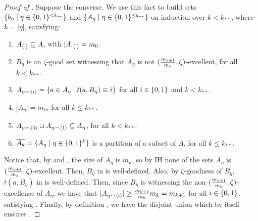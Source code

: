     \begin{proof}[Proof of ]
        Suppose the converse.
        We use this fact to build sets $\{ b_\eta \mid \eta \in \{ 0,1 \}^{<k_{**}} \}$ and
        $\{ A_\eta \mid \eta \in \{ 0,1 \}^{\leq k_{**}} \}$ on induction over $k<k_{**}$, where $k = |\eta|$,
        satisfying:
        \begin{enumerate}
            \item\label{itm:existance_of_excellent_subsets_fixed_size_choices.1} $A_{\left< \cdot \right>} \subseteq A$, with $|A|_{\left< \cdot \right>} = m_0$.
            \item\label{itm:existance_of_excellent_subsets_fixed_size_choices.2} $B_\eta$ is an $\zeta$-good set witnessing that $A_\eta$ is not
                $( \frac{m_{k+1}}{m_{k}}, \zeta )$-excellent, for all $k < k_{**}$.
            \item\label{itm:existance_of_excellent_subsets_fixed_size_choices.3} $A_{\eta \frown \left< i \right>} = \{ a \in A_\eta \mid t(a, B_\eta) \equiv i \}$
                for all $i \in \{ 0,1 \}$ and $k < k_{**}$.
            \item\label{itm:existance_of_excellent_subsets_fixed_size_choices.4} $|A_{\eta}| = m_k$, for all $k \leq k_{**}$.
            \item\label{itm:existance_of_excellent_subsets_fixed_size_choices.6} $A_{\eta \frown \left< 0 \right>} \sqcup A_{\eta \frown \left< 1 \right>} \subseteq A_\eta$,
                for all $k < k_{**}$.
            \item\label{itm:existance_of_excellent_subsets_fixed_size_choices.7} $\overline{A_k} = \{ A_\eta \mid \eta \in \{ 0,1 \}^k \}$ is a partition of
                a subset of $A$, for all $k \leq k_{**}$.
        \end{enumerate}
        Notice that, by  and
        , the size of $A_\eta$ is $m_k$,
        so by IH none of the sets $A_\eta$ is $( \frac{m_{k+1}}{m_{k}}, \zeta )$-excellent.
        Then, $B_\eta$ in  is well-defined.
        Also, by $\zeta$-goodness of $B_\eta$, $t(a, B_\eta)$ in  is well-defined.
        Then, since $B_\eta$ is witnessing the non-$( \frac{m_{k+1}}{m_{k}}, \zeta )$-excellence of $A_\eta$,
        we have that $|A_{\eta \frown \left< i \right>}| \geq \frac{m_{k+1}}{m_k} m_{k} = m_{k+1}$ for all
        $i \in \{ 0,1 \}$, satisfying .
        Finally, by definition , we have the disjoint union
         which by itself
        ensures .


\end{proof}
